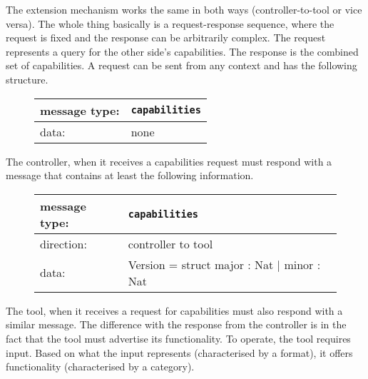 \documentclass{article}
\newcommand{\msg}[1]{\texttt{#1}}
\begin{document}
   The extension mechanism works the same in both ways (controller-to-tool or
   vice versa). The whole thing basically is a request-response sequence,
   where the request is fixed and the response can be arbitrarily complex. The
   request represents a query for the other side's capabilities. The response
   is the combined set of capabilities. A request can be sent from any context
   and has the following structure.

   \begin{figure}[H]
    \begin{center}
     \begin{tabular}{|ll|}
      \hline
      message type:    & \msg{capabilities} \\
      \hline
      data:            & none \\
      \hline
     \end{tabular}
    \end{center}
   \end{figure}

   The controller, when it receives a capabilities request must respond with a
   message that contains at least the following information.

   \begin{figure}[H]
    \begin{center}
     \begin{tabular}{|ll|}
      \hline
       message type:   & \msg{capabilities} \\
      \hline
       direction:      & controller to tool \\
       data:           & Version = struct major : Nat $|$ minor : Nat \\
      \hline
     \end{tabular}
    \end{center}
   \end{figure}

   \noindent The tool, when it receives a request for capabilities must also respond with
   a similar message. The difference with the response from the controller is
   in the fact that the tool must advertise its functionality. To operate, the
   tool requires input. Based on what the input represents (characterised by a
   format), it offers functionality (characterised by a category).
   
\end{document}
